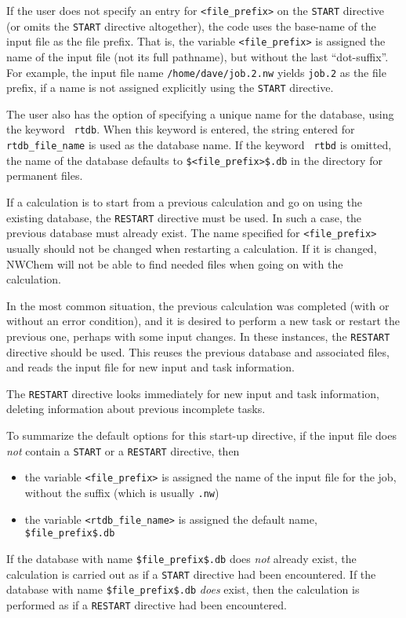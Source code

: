 If the user does not specify an entry for {\tt <file\_prefix>} on the
\verb+START+ directive (or omits the \verb+START+ directive
altogether), the code uses the base-name of the input file as the file
prefix.  That is, the variable {\tt <file\_prefix>} is assigned the
name of the input file (not its full pathname), but without the last
``dot-suffix''.  For example, the input file name
\verb+/home/dave/job.2.nw+ yields \verb+job.2+ as the file prefix, if
a name is not assigned explicitly using the \verb+START+ directive.

The user also has the option of
specifying a unique name for the database, using the keyword {\tt
  rtdb}.  When this keyword is entered, the string entered for {\tt
  rtdb\_file\_name} is used as the database name.  If the keyword {\tt
  rtbd} is omitted, the name of the database defaults to
\verb+$<file_prefix>$.db+ in the directory for permanent files.

If a calculation is to start from a previous calculation and go on
using the existing database, the \verb+RESTART+ directive 
must be used.  In such a case, the previous
database must already exist.  The name specified for {\tt <file\_prefix>} 
usually should
not be changed when restarting a calculation.  If it is changed, NWChem 
will not
be able to find needed files when going on with the
calculation.

In the most common
situation, the previous calculation was completed (with or without an error
condition), and it is desired to perform a new task or restart the
previous one, perhaps with some input changes.  In these instances,
the \verb+RESTART+ directive should be used.  This reuses the previous
database and associated files, and reads the input file for new input
and task information.

The \verb+RESTART+ directive looks immediately for new input and task
information, deleting information about previous incomplete tasks.

To summarize the default options for this start-up directive, if the 
input file does {\em not} contain a \verb+START+ or a
\verb+RESTART+ directive, then
\begin{itemize}
  \item the variable {\tt <file\_prefix>} is assigned the name of the 
input file for the job, without the suffix (which is usually \verb+.nw+)
  \item the variable {\tt <rtdb\_file\_name>} is assigned the default name,
\verb+$file_prefix$.db+
\end{itemize}
If the database with name \verb+$file_prefix$.db+ does {\em not} 
already exist,
the calculation is carried out as if a \verb+START+ directive had
been encountered.  If the database with name \verb+$file_prefix$.db+
{\em does} exist, then the calculation is performed as if a
\verb+RESTART+ directive had been encountered.  


